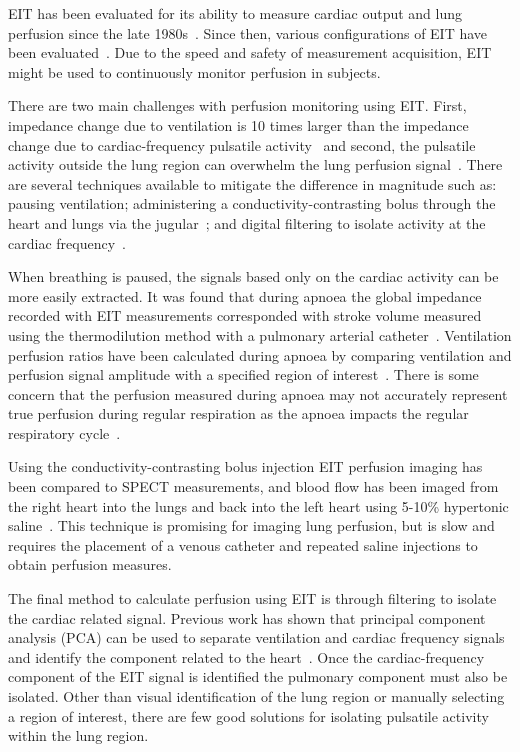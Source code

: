 EIT has been evaluated for its ability to measure cardiac output and
lung perfusion since the late 1980s~\parencite{Eyuboglu1989,Blottt1992,Brown1992,Frerichs2002}. 
Since then, various configurations of EIT have been evaluated~\parencite{Borges2012,Nguyen2015}.
Due to the speed and safety of measurement acquisition, EIT might be used to continuously monitor 
perfusion in subjects.

There are two main challenges with perfusion monitoring using EIT. First, impedance change due to ventilation 
is 10 times larger than the impedance change due to cardiac-frequency pulsatile activity~\parencite{Deibele2008}
and second, the pulsatile activity outside the lung region can overwhelm the lung perfusion signal~\parencite{Stowe2019}. 
There are several techniques available to mitigate the difference 
in magnitude such as: pausing ventilation; administering a 
conductivity-contrasting bolus through the heart and lungs via the jugular~\parencite{Frerichs2002};
and digital filtering to isolate activity at the cardiac frequency~\parencite{Leathard1994}. 

When breathing is paused, the signals based only on the cardiac activity can be more easily extracted. 
It was found that during apnoea the global impedance recorded with EIT measurements corresponded with stroke volume 
measured using the 
thermodilution method with a pulmonary arterial catheter~\parencite{Fagerberg2009}.
Ventilation perfusion ratios have been calculated during apnoea by comparing 
ventilation and perfusion signal amplitude with a specified region of 
interest~\parencite{Fagerberg2009a}.
There is some concern that the perfusion measured during apnoea may not accurately represent 
true perfusion during regular respiration as the apnoea impacts the regular respiratory cycle~\parencite{Leonhardt2012}.

Using the conductivity-contrasting bolus injection EIT perfusion imaging has been compared to 
SPECT measurements, and blood flow has been imaged from the right heart into the lungs and back into the left heart
using 5-10\% hypertonic saline~\parencite{Frerichs2002,Borges2012}. This technique is promising 
for imaging lung perfusion, but is slow and requires the placement of a venous catheter 
and repeated saline injections to obtain perfusion measures. 

The final method to calculate perfusion using EIT is through filtering to isolate the 
cardiac related signal. Previous work has shown that principal component analysis (PCA) 
can be used to separate ventilation and cardiac frequency signals and identify the component 
related to the heart~\parencite{Deibele2008}. Once the cardiac-frequency component of the 
EIT signal is identified the pulmonary component must also be isolated. Other than visual 
identification of the lung region or manually selecting a region of interest,
there are few good solutions for isolating pulsatile activity within the lung region.


